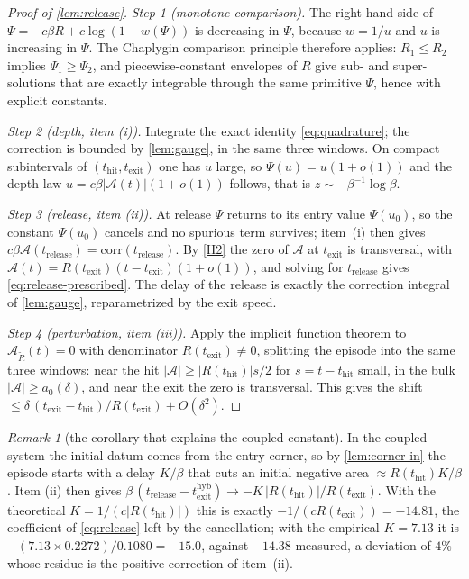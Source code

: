 \documentclass[11pt]{article}
\theoremstyle{definition}
\theoremstyle{remark}
\newtheorem{remark}[remark]{Remark}
\newcommand{\thit}{t_{\mathrm{hit}}}
\newcommand{\texit}{t_{\mathrm{exit}}}
\newcommand{\trel}{t_{\mathrm{release}}}
\newcommand{\Ar}{\mathcal{A}}                      %
\newcommand{\hyb}{\mathrm{hyb}}
\begin{document}
\begin{proof}[Proof of \cref{lem:release}]
\emph{Step 1 (monotone comparison).} The right-hand side of
$\dot\Psi=-c\beta R+c\log(1+w(\Psi))$ is decreasing in $\Psi$, because $w=1/u$
and $u$ is increasing in $\Psi$. The Chaplygin comparison principle therefore
applies: $R_1\le R_2$ implies $\Psi_1\ge\Psi_2$, and piecewise-constant envelopes
of $R$ give sub- and super-solutions that are exactly integrable through the same
primitive $\Psi$, hence with explicit constants.

\emph{Step 2 (depth, item (i)).} Integrate the exact identity
\eqref{eq:quadrature}; the correction is bounded by \cref{lem:gauge}, in the same
three windows. On compact subintervals of $(\thit,\texit)$ one has $u$ large, so
$\Psi(u)=u(1+o(1))$ and the depth law $u=c\beta|\Ar(t)|(1+o(1))$ follows, that is
$z\sim-\beta^{-1}\log\beta$.

\emph{Step 3 (release, item (ii)).} At release $\Psi$ returns to its entry value
$\Psi(u_0)$, so the constant $\Psi(u_0)$ cancels and no spurious term survives;
item~(i) then gives $c\beta\Ar(\trel)=\mathrm{corr}(\trel)$. By \eqref{H2} the
zero of $\Ar$ at $\texit$ is transversal, with
$\Ar(t)=R(\texit)(t-\texit)(1+o(1))$, and solving for $\trel$ gives
\eqref{eq:release-prescribed}. The delay of the release is exactly the correction
integral of \cref{lem:gauge}, reparametrized by the exit speed.

\emph{Step 4 (perturbation, item (iii)).} Apply the implicit function theorem to
$\Ar_{\tilde R}(t)=0$ with denominator $R(\texit)\ne0$, splitting the episode into
the same three windows: near the hit $|\Ar|\ge|R(\thit)|s/2$ for $s=t-\thit$
small, in the bulk $|\Ar|\ge a_0(\delta)$, and near the exit the zero is
transversal. This gives the shift
$\le\delta\,(\texit-\thit)/R(\texit)+O(\delta^{2})$.
\end{proof}

\begin{remark}[the corollary that explains the coupled constant]\label{rem:L4cor}
In the coupled system the initial datum comes from the entry corner, so by
\cref{lem:corner-in} the episode starts with a delay $K/\beta$ that cuts an
initial negative area $\approx R(\thit)K/\beta$. Item (ii) then gives
$\beta\,(\trel-\texit^{\hyb})\to-K\,|R(\thit)|/R(\texit)$. With the theoretical
$K=1/(c|R(\thit)|)$ this is exactly $-1/(cR(\texit))=-14.81$, the
coefficient of \eqref{eq:release} left by the cancellation; with the
empirical $K=7.13$ it is
$-(7.13\times0.2272)/0.1080=-15.0$, against $-14.38$ measured, a deviation of
$4\%$ whose residue is the positive correction of item~(ii).
\end{remark}
\end{document}

